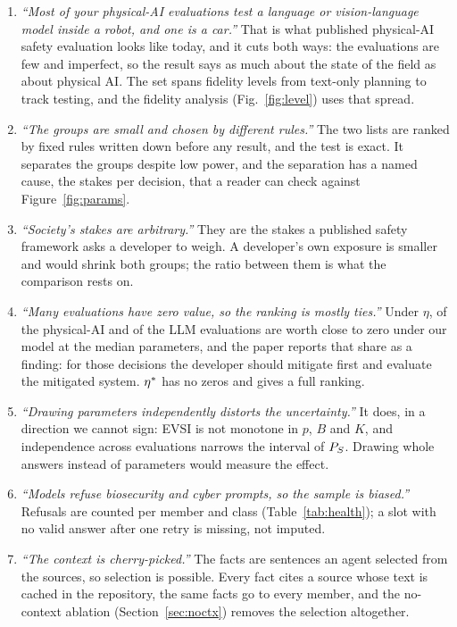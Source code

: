 \documentclass{article}
\begin{document}
\begin{enumerate}
\item \emph{``Most of your physical-AI evaluations test a language or vision-language model inside a robot, and one is a car.''} That is what published physical-AI safety evaluation looks like today, and it cuts both ways: the evaluations are few and imperfect, so the result says as much about the state of the field as about physical AI. The set spans fidelity levels from text-only planning to track testing, and the fidelity analysis (Fig.~\ref{fig:level}) uses that spread.
\item \emph{``The groups are small and chosen by different rules.''} The two lists are ranked by fixed rules written down before any result, and the test is exact. It separates the groups despite low power, and the separation has a named cause, the stakes per decision, that a reader can check against Figure~\ref{fig:params}. %
\item \emph{``Society's stakes are arbitrary.''} They are the stakes a published safety framework asks a developer to weigh. A developer's own exposure is smaller and would shrink both groups; the ratio between them is what the comparison rests on.
\item \emph{``Many evaluations have zero value, so the ranking is mostly ties.''} Under $\eta$, \voiZeroSharePhysical{} of the physical-AI and \voiZeroShareLLM{} of the LLM evaluations are worth close to zero under our model at the median parameters, and the paper reports that share as a finding: for those decisions the developer should mitigate first and evaluate the mitigated system. $\eta^{*}$ has no zeros and gives a full ranking. %
\item \emph{``Drawing parameters independently distorts the uncertainty.''} It does, in a direction we cannot sign: EVSI is not monotone in $p$, $B$ and $K$, and independence across evaluations narrows the interval of $P_{S}$. Drawing whole answers instead of parameters would measure the effect.
\item \emph{``Models refuse biosecurity and cyber prompts, so the sample is biased.''} Refusals are counted per member and class (Table~\ref{tab:health}); a slot with no valid answer after one retry is missing, not imputed.
\item \emph{``The context is cherry-picked.''} The facts are sentences an agent selected from the sources, so selection is possible. Every fact cites a source whose text is cached in the repository, the same facts go to every member, and the no-context ablation (Section~\ref{sec:noctx}) removes the selection altogether.
\end{enumerate}
\end{document}
